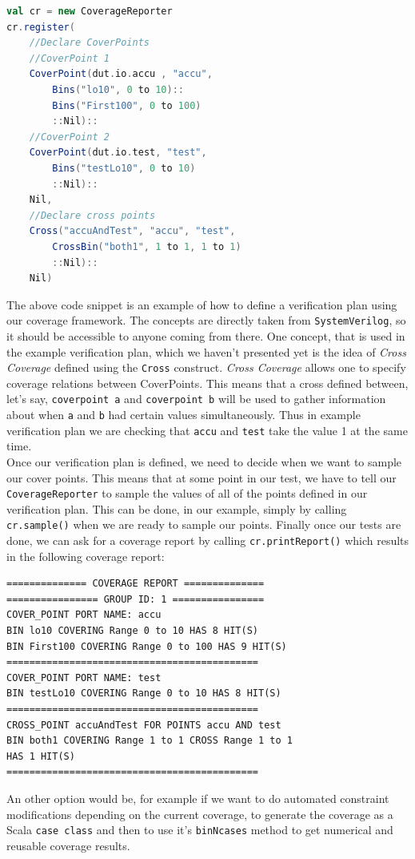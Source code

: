 \documentclass[runningheads]{llncs}
\begin{document}
\begin{lstlisting}[language=scala]
val cr = new CoverageReporter
cr.register(
    //Declare CoverPoints
    //CoverPoint 1
    CoverPoint(dut.io.accu , "accu",
        Bins("lo10", 0 to 10)::
        Bins("First100", 0 to 100)
        ::Nil)::
    //CoverPoint 2
    CoverPoint(dut.io.test, "test", 
        Bins("testLo10", 0 to 10)
        ::Nil)::
    Nil,
    //Declare cross points
    Cross("accuAndTest", "accu", "test",
        CrossBin("both1", 1 to 1, 1 to 1)
        ::Nil)::
    Nil)
\end{lstlisting}
The above code snippet is an example of how to define a verification plan using our coverage framework. The concepts are directly taken from \texttt{SystemVerilog}, so it should be accessible to anyone coming from there. One concept, that is used in the example verification plan, which we haven't presented yet is the idea of \textit{Cross Coverage} defined using the \texttt{Cross} construct. \textit{Cross Coverage} allows one to specify coverage relations between CoverPoints. This means that a cross defined between, let's say, \texttt{coverpoint a} and \texttt{coverpoint b} will be used to gather information about when \texttt{a} and \texttt{b} had certain values simultaneously. Thus in example verification plan we are checking that \texttt{accu} and \texttt{test} take the value 1 at the same time.\\
Once our verification plan is defined, we need to decide when we want to sample our cover points. This means that at some point in our test, we have to tell our \texttt{CoverageReporter} to sample the values of all of the points defined in our verification plan. This can be done, in our example, simply by calling \texttt{cr.sample()} when we are ready to sample our points. Finally once our tests are done, we can ask for a coverage report by calling \texttt{cr.printReport()} which results in the following coverage report: 
\begin{verbatim}
============== COVERAGE REPORT ==============
================ GROUP ID: 1 ================
COVER_POINT PORT NAME: accu
BIN lo10 COVERING Range 0 to 10 HAS 8 HIT(S)
BIN First100 COVERING Range 0 to 100 HAS 9 HIT(S)
============================================
COVER_POINT PORT NAME: test
BIN testLo10 COVERING Range 0 to 10 HAS 8 HIT(S)
============================================
CROSS_POINT accuAndTest FOR POINTS accu AND test
BIN both1 COVERING Range 1 to 1 CROSS Range 1 to 1 
HAS 1 HIT(S)
============================================
\end{verbatim}
An other option would be, for example if we want to do automated constraint modifications depending on the current coverage, to generate the coverage as a Scala \texttt{case class} and then to use it's \texttt{binNcases} method to get numerical and reusable coverage results.  
  
\end{document}
